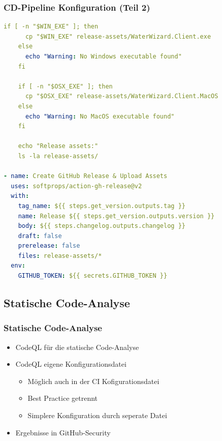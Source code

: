 \documentclass{beamer}
\begin{document}
\begin{frame}[fragile]
\frametitle{CD-Pipeline Konfiguration (Teil 2)}
  \begin{lstlisting}[language=yaml, basicstyle=\ttfamily\tiny, breaklines=true]
    if [ -n "$WIN_EXE" ]; then
      cp "$WIN_EXE" release-assets/WaterWizard.Client.exe
    else
      echo "Warning: No Windows executable found"
    fi

    if [ -n "$OSX_EXE" ]; then
      cp "$OSX_EXE" release-assets/WaterWizard.Client.MacOS
    else
      echo "Warning: No MacOS executable found"
    fi

    echo "Release assets:"
    ls -la release-assets/
 
- name: Create GitHub Release & Upload Assets
  uses: softprops/action-gh-release@v2
  with:
    tag_name: ${{ steps.get_version.outputs.tag }}
    name: Release ${{ steps.get_version.outputs.version }}
    body: ${{ steps.changelog.outputs.changelog }}
    draft: false
    prerelease: false
    files: release-assets/*
  env:
    GITHUB_TOKEN: ${{ secrets.GITHUB_TOKEN }} 
  \end{lstlisting}
\end{frame}

\subsection{Statische Code-Analyse}
\begin{frame}
\frametitle{Statische Code-Analyse}
  \begin{itemize}
    \item CodeQL für die statische Code-Analyse
    \item CodeQL eigene Konfigurationsdatei
      \begin{itemize} 
        \item Möglich auch in der CI Kofigurationsdatei
        \item Best Practice getrennt
        \item Simplere Konfiguration durch seperate Datei
      \end{itemize} 
    \item Ergebnisse in GitHub-Security
  \end{itemize}
\end{frame}
\end{document}
